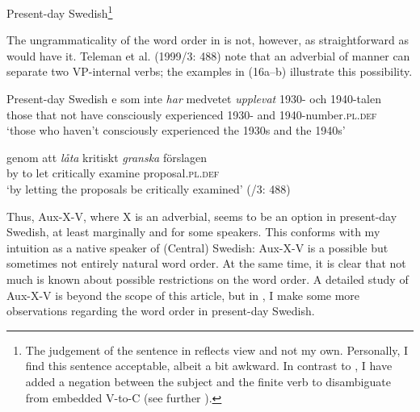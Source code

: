 \documentclass[output=paper, colorlinks, citecolor=brown]{langscibook}
\begin{document}
\ea Present-day Swedish\footnote{The judgement of the sentence in  reflects  view and not my own. Personally, I find this sentence acceptable, albeit a bit awkward. In contrast to \citet[157]{Petzell2011}, I have added a negation between the subject and the finite verb to disambiguate from embedded V-to-C (see further ).}
\label{ex:sangfelt:15}

\z 
\z 


The ungrammaticality of the word order in  is not, however, as straightforward as \citet{Petzell2011} would have it. Teleman et al. (1999/3: 488) note that an adverbial of manner can separate two VP-internal verbs; the examples in (16a–b) illustrate this possibility.


\ea Present-day Swedish\label{ex:sangfelt:16}
\ea\label{ex:sangfelt:16a}
\gll [d]e som inte \textit{har} {medvetet} \textit{upplevat } 1930- och 1940-talen \\
 those that not have consciously experienced 1930- and 1940-number\textsc{.pl.def}\\
\glt ‘those who haven’t consciously experienced the 1930s and the 1940s’

\ex\label{ex:sangfelt:16b}
\gll genom att \textit{låta} {kritiskt} \textit{granska} förslagen \\
 by to let critically examine proposal.\textsc{pl.def}\\
 \glt ‘by letting the proposals be critically examined’ (\citealt{TelemanEtAl1999}/3: 488)\\
\z
\z

Thus, Aux-X-V, where X is an adverbial, seems to be an option in present-day Swedish, at least marginally and for some speakers. This conforms with my intuition as a native speaker of (Central) Swedish: Aux-X-V is a possible but sometimes not entirely natural word order. At the same time, it is clear that not much is known about possible restrictions on the word order. A detailed study of Aux-X-V is beyond the scope of this article, but in , I make some more observations regarding the word order in present-day Swedish.
\end{document}
